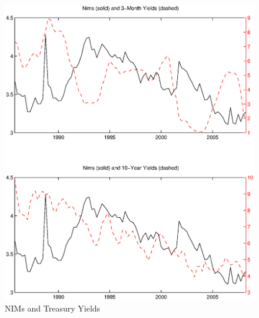 \documentclass[11pt]{article}
\begin{document}
\newpage \clearpage
\begin{figure}
\caption{NIMs and Treasury Yields} \label{figure_nims_rates}
\center
\includegraphics[scale=0.85]{figure_nims_rates.ps}
\end{figure}
\end{document}
